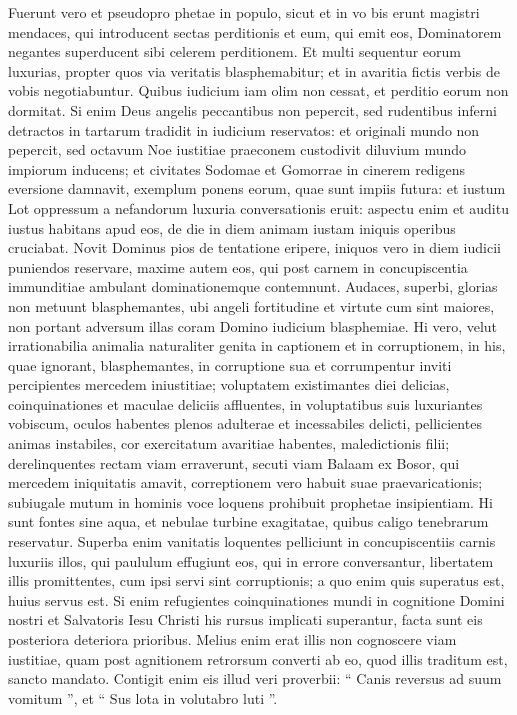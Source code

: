 \begin{biblechapter}
\begin{biblechapter}
\verse Fuerunt vero et pseudopro phetae in populo, sicut et in vo bis erunt magistri mendaces, qui introducent sectas perditionis et eum, qui emit eos, Dominatorem negantes superducent sibi celerem perditionem. 
\verse Et multi sequentur eorum luxurias, propter quos via veritatis blasphemabitur; 
\verse et in avaritia fictis verbis de vobis negotiabuntur. Quibus iudicium iam olim non cessat, et perditio eorum non dormitat.
 \verse Si enim Deus angelis peccantibus non pepercit, sed rudentibus inferni detractos in tartarum tradidit in iudicium reservatos: 
\verse et originali mundo non pepercit, sed octavum Noe iustitiae praeconem custodivit diluvium mundo impiorum inducens; 
\verse et civitates Sodomae et Gomorrae in cinerem redigens eversione damnavit, exemplum ponens eorum, quae sunt impiis futura: 
 \verse et iustum Lot oppressum a nefandorum luxuria conversationis eruit: 
\verse aspectu enim et auditu iustus habitans apud eos, de die in diem animam iustam iniquis operibus cruciabat. 
\verse Novit Dominus pios de tentatione eripere, iniquos vero in diem iudicii puniendos reservare, 
\verse maxime autem eos, qui post carnem in concupiscentia immunditiae ambulant dominationemque contemnunt.
 Audaces, superbi, glorias non metuunt blasphemantes, 
\verse ubi angeli fortitudine et virtute cum sint maiores, non portant adversum illas coram Domino iudicium blasphemiae. 
\verse Hi vero, velut irrationabilia animalia naturaliter genita in captionem et in corruptionem, in his, quae ignorant, blasphemantes, in corruptione sua et corrumpentur 
\verse inviti percipientes mercedem iniustitiae; voluptatem existimantes diei delicias, coinquinationes et maculae deliciis affluentes, in voluptatibus suis luxuriantes vobiscum, 
 \verse oculos habentes plenos adulterae et incessabiles delicti, pellicientes animas instabiles, cor exercitatum avaritiae habentes, maledictionis filii; 
 \verse derelinquentes rectam viam erraverunt, secuti viam Balaam ex Bosor, qui mercedem iniquitatis amavit, 
\verse correptionem vero habuit suae praevaricationis; subiugale mutum in hominis voce loquens prohibuit prophetae insipientiam. 
\verse Hi sunt fontes sine aqua, et nebulae turbine exagitatae, quibus caligo tenebrarum reservatur. 
\verse Superba enim vanitatis loquentes pelliciunt in concupiscentiis carnis luxuriis illos, qui paululum effugiunt eos, qui in errore conversantur, 
\verse libertatem illis promittentes, cum ipsi servi sint corruptionis; a quo enim quis superatus est, huius servus est.
 \verse Si enim refugientes coinquinationes mundi in cognitione Domini nostri et Salvatoris Iesu Christi his rursus implicati superantur, facta sunt eis posteriora deteriora prioribus. 
\verse Melius enim erat illis non cognoscere viam iustitiae, quam post agnitionem retrorsum converti ab eo, quod illis traditum est, sancto mandato. 
\verse Contigit enim eis illud veri proverbii:
 “ Canis reversus ad suum vomitum ”,
 et “ Sus lota in volutabro luti ”.
 

\end{biblechapter}
\end{biblechapter}
